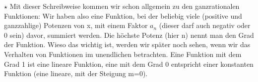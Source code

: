 		\(\star\) Mit dieser Schreibweise kommen wir schon allgemein zu den
		ganzrationalen Funktionen:
		\formel{\[f(x)=a_n \cdot x^n+a_{n-1} \cdot x^{n-1}+\ldots +a_1 \cdot x+a_0\]}
		Wir haben also eine Funktion, bei der beliebig viele (positive und
		ganzzahlige) Potenzen von x, mit einem Faktor \(a_n\) (dieser darf auch
		negativ oder 0 sein) davor, summiert werden. Die höchste Potenz (hier n) nennt
		man den Grad der Funktion. Wieso das wichtig ist, werden wir später noch
		sehen, wenn wir das Verhalten von Funktionen im unendlichen betrachten. Eine
		Funktion mit dem Grad 1 ist eine lineare Funktion, eine mit dem Grad 0
		entspricht einer konstanten Funktion (eine lineare, mit der Steigung m=0).


